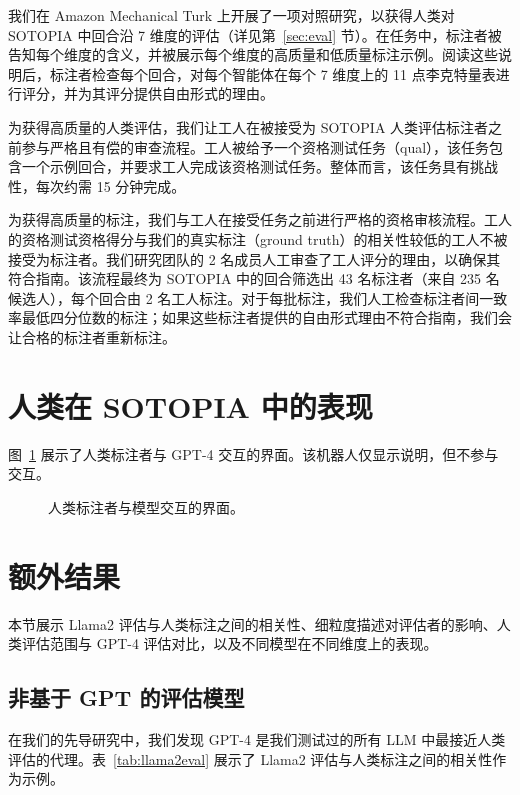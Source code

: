 \documentclass[11pt,a4paper]{article}
\begin{document}
我们在 Amazon Mechanical Turk 上开展了一项对照研究，以获得人类对 SOTOPIA 中回合沿 7 维度的评估（详见第~\ref{sec:eval} 节）。在任务中，标注者被告知每个维度的含义，并被展示每个维度的高质量和低质量标注示例。阅读这些说明后，标注者检查每个回合，对每个智能体在每个 7 维度上的 11 点李克特量表进行评分，并为其评分提供自由形式的理由。

为获得高质量的人类评估，我们让工人在被接受为 SOTOPIA 人类评估标注者之前参与严格且有偿的审查流程。工人被给予一个资格测试任务（qual），该任务包含一个示例回合，并要求工人完成该资格测试任务。整体而言，该任务具有挑战性，每次约需 15 分钟完成。

为获得高质量的标注，我们与工人在接受任务之前进行严格的资格审核流程。工人的资格测试资格得分与我们的真实标注（ground truth）的相关性较低的工人不被接受为标注者。我们研究团队的 2 名成员人工审查了工人评分的理由，以确保其符合指南。该流程最终为 SOTOPIA 中的回合筛选出 43 名标注者（来自 235 名候选人），每个回合由 2 名工人标注。对于每批标注，我们人工检查标注者间一致率最低四分位数的标注；如果这些标注者提供的自由形式理由不符合指南，我们会让合格的标注者重新标注。

\section{人类在 SOTOPIA 中的表现}
\label{app:humaninterface}

图~\ref{fig:humaninterface} 展示了人类标注者与 GPT-4 交互的界面。该机器人仅显示说明，但不参与交互。

\begin{figure}[htbp]
\centering
{}
\caption{人类标注者与模型交互的界面。}
\label{fig:humaninterface}
\end{figure}

\section{额外结果}
\label{app:addresults}

本节展示 Llama2 评估与人类标注之间的相关性、细粒度描述对评估者的影响、人类评估范围与 GPT-4 评估对比，以及不同模型在不同维度上的表现。

\subsection{非基于 GPT 的评估模型}

在我们的先导研究中，我们发现 GPT-4 是我们测试过的所有 LLM 中最接近人类评估的代理。表~\ref{tab:llama2eval} 展示了 Llama2 评估与人类标注之间的相关性作为示例。
\end{document}
